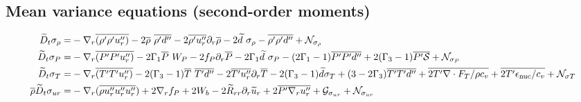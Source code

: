 \documentclass[10pt,paper=a4]{report}
\newcommand{\eht}{\overline}
\newcommand{\fht}{\widetilde}
\begin{document}
\subsection{Mean variance equations (second-order moments)}

\begin{table}[!h]
\label{tab:rans-variances1}
\begin{align}
\fht{D}_t \sigma_\rho =  &  - \nabla_r \eht{(\rho' \rho ' u''_r)}  - 2\eht{\rho} \ \eht{\rho'd''} - 2 \eht{\rho'u''_r} \partial_r \eht{\rho} - 2 \fht{d} \ \sigma_\rho - \eht{\rho'\rho'd''} + {\mathcal N_{\sigma_\rho}} \\
\fht{D}_t \sigma_P = & - \nabla_r \eht{(P' P' u''_r)} - 2\Gamma_1 \eht{P} \ W_P - 2 f_P \partial_r \eht{P} - 2\Gamma_1 \widetilde{d} \ \sigma_P - (2 \Gamma_1 -1) \eht{P'P'd''} + 2(\Gamma_3 - 1)\eht{P' {\mathcal S}} + {\mathcal N_{\sigma_P}} \\
\fht{D}_t \sigma_T = & -\nabla_r \eht{(T' T' u''_r)} - 2(\Gamma_3 -1)\eht{T} \ \eht{T'd''} - 2\eht{T'u''_r} \partial_r \eht{T} - 2(\Gamma_3-1)\fht{d}\sigma_T + (3-2\Gamma_3)\eht{T'T'd''} + \eht{2 T' \nabla \cdot F_T/ \rho c_v} + \eht{2 T' \epsilon_{\rm nuc} / c_v} + {\mathcal N_{\sigma T}}  \\
\eht{\rho} \fht{D}_t \sigma_{ur} = & -\nabla_r ( \eht{\rho u''_r u''_r u''_r} ) + 2 \nabla_r f_P + 2 W_b - 2\fht{R}_{rr}\partial_r \fht{u}_r + 2 \overline{P'\nabla_r u''_r} + {\mathcal G_{\sigma_{ur}}} + {\mathcal N_{\sigma_{ur}}} 
\end{align}
\end{table}
\end{document}
